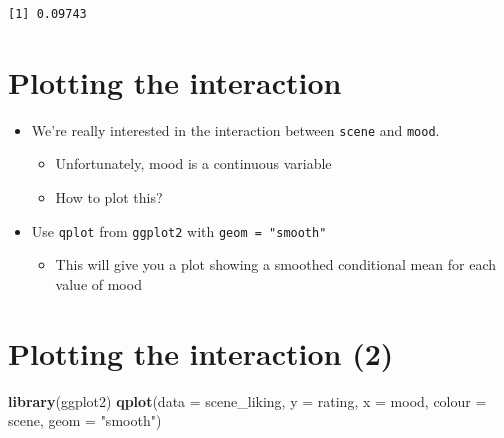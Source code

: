 \documentclass[]{article}
\newenvironment{Shaded}{}{}
\newcommand{\KeywordTok}[1]{\textcolor[rgb]{0.00,0.44,0.13}{\textbf{{#1}}}}
\newcommand{\DataTypeTok}[1]{\textcolor[rgb]{0.56,0.13,0.00}{{#1}}}
\newcommand{\StringTok}[1]{\textcolor[rgb]{0.25,0.44,0.63}{{#1}}}
\newcommand{\NormalTok}[1]{{#1}}
\begin{document}
\begin{verbatim}
[1] 0.09743
\end{verbatim}

\section{Plotting the interaction}\label{plotting-the-interaction}

\begin{itemize}
\itemsep1pt\parskip0pt
\item
  We're really interested in the interaction between \texttt{scene} and
  \texttt{mood}.

  \begin{itemize}
  \itemsep1pt\parskip0pt
  \item
    Unfortunately, mood is a continuous variable
  \item
    How to plot this?
  \end{itemize}
\item
  Use \texttt{qplot} from \texttt{ggplot2} with \texttt{geom = "smooth"}

  \begin{itemize}
  \itemsep1pt\parskip0pt
  \item
    This will give you a plot showing a smoothed conditional mean for
    each value of mood
  \end{itemize}
\end{itemize}

\section{Plotting the interaction (2)}\label{plotting-the-interaction-2}

\begin{Shaded}
\begin{Highlighting}[]
\KeywordTok{library}\NormalTok{(ggplot2)}
\KeywordTok{qplot}\NormalTok{(}\DataTypeTok{data =} \NormalTok{scene_liking, }\DataTypeTok{y =} \NormalTok{rating, }\DataTypeTok{x =} \NormalTok{mood, }\DataTypeTok{colour =} \NormalTok{scene, }\DataTypeTok{geom =} \StringTok{"smooth"}\NormalTok{)}
\end{Highlighting}
\end{Shaded}
\end{document}
